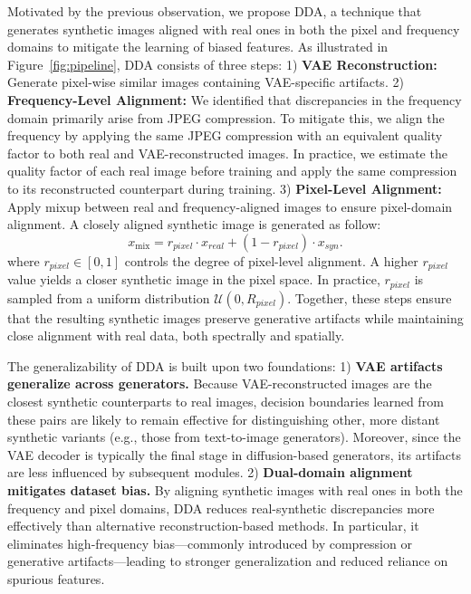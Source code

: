 \documentclass{article}
\begin{document}
Motivated by the previous observation, we propose DDA, a technique that generates synthetic images aligned with real ones in both the pixel and frequency domains to mitigate the learning of biased features.
As illustrated in Figure~\ref{fig:pipeline}, DDA consists of three steps: 
1) \textbf{VAE Reconstruction:} Generate pixel-wise similar images containing VAE-specific artifacts.  
2) \textbf{Frequency-Level Alignment:} 
We identified that discrepancies in the frequency domain primarily arise from JPEG compression. To mitigate this, we align the frequency by applying the same JPEG compression with an equivalent quality factor to both real and VAE-reconstructed images. In practice, we estimate the quality factor of each real image before training and apply the same compression to its reconstructed counterpart during training.
3) \textbf{Pixel-Level Alignment:} Apply mixup between real and frequency-aligned images to ensure pixel-domain alignment. A closely aligned synthetic image is generated as follow:
\begin{equation}
    x_{\text{mix}} = r_{pixel} \cdot x_{real} + (1 - r_{pixel}) \cdot x_{syn}.
\end{equation}
where $r_{pixel} \in [0, 1]$ controls the degree of pixel-level alignment. A higher $r_{pixel}$ value yields a closer synthetic image in the pixel space. In practice, $r_{pixel}$ is sampled from a uniform distribution $\mathcal{U}(0, R_{pixel})$.
Together, these steps ensure that the resulting synthetic images preserve generative artifacts while maintaining close alignment with real data, both spectrally and spatially.


The generalizability of DDA is built upon two foundations:  
1) \textbf{VAE artifacts generalize across generators.} Because VAE-reconstructed images are the closest synthetic counterparts to real images, decision boundaries learned from these pairs are likely to remain effective for distinguishing other, more distant synthetic variants (e.g., those from text-to-image generators). Moreover, since the VAE decoder is typically the final stage in diffusion-based generators, its artifacts are less influenced by subsequent modules.  
2) \textbf{Dual-domain alignment mitigates dataset bias.} By aligning synthetic images with real ones in both the frequency and pixel domains, DDA reduces real-synthetic discrepancies more effectively than alternative reconstruction-based methods. In particular, it eliminates high-frequency bias—commonly introduced by compression or generative artifacts—leading to stronger generalization and reduced reliance on spurious features.
\end{document}
